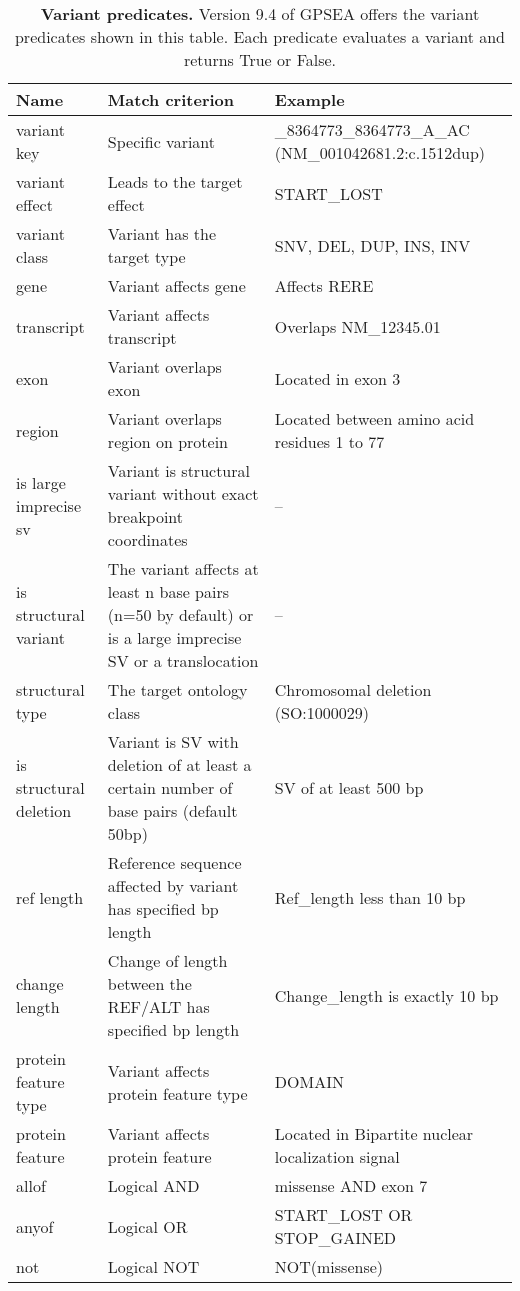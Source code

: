 
\begin{table}
\centering
\renewcommand{\arraystretch}{1.2} %
\begin{tabular}{l>{\raggedright\arraybackslash}p{6cm}>{\raggedright\arraybackslash}p{6cm}}
\toprule
\textbf{Name} & \textbf{Match criterion} & \textbf{Example}\\
\midrule
variant key & Specific variant & 1\_8364773\_8364773\_A\_AC (NM\_001042681.2:c.1512dup) \\
variant effect & Leads to the target effect & START\_LOST \\
variant class & Variant has the target type & SNV, DEL, DUP, INS, INV \\
gene & Variant affects gene & Affects RERE \\
transcript & Variant affects transcript & Overlaps NM\_12345.01 \\
exon & Variant overlaps exon & Located in exon 3 \\
region & Variant overlaps region on protein & Located between amino acid residues 1 to 77 \\
is large imprecise sv & Variant is structural variant without exact breakpoint coordinates & -- \\
is structural variant & The variant affects at least n base pairs (n=50 by default) or is a large imprecise SV or a translocation & -- \\
structural type & The target ontology class & Chromosomal deletion (SO:1000029) \\
is structural deletion & Variant is SV with deletion of at least a certain number of base pairs (default 50bp) & SV of at least 500 bp \\
ref length & Reference sequence affected by variant has specified bp length & Ref\_length less than 10 bp \\
change length & Change of length between the REF/ALT has specified bp length & Change\_length is exactly 10 bp \\
protein feature type & Variant affects protein feature type & DOMAIN \\
protein feature & Variant affects protein feature & Located in Bipartite nuclear localization signal \\
allof & Logical AND & missense AND exon 7 \\
anyof & Logical OR & START\_LOST OR STOP\_GAINED \\
not & Logical NOT & NOT(missense) \\
\bottomrule
\end{tabular}
\caption{\textbf{Variant predicates.} Version 9.4 of GPSEA offers the variant predicates shown in this table. Each predicate evaluates a variant and returns True or False.}
\label{tab:varpredicates}
\end{table}

